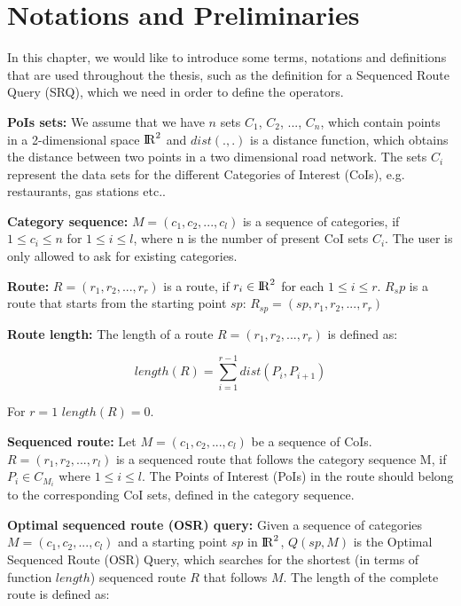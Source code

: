 \chapter{Notations and Preliminaries} 
\label{sec:notes}
In this chapter, we would like to introduce some terms, notations and definitions that are used throughout the thesis, such as the definition for a Sequenced Route Query (SRQ), which we need in order to define the operators.

\textbf{PoIs sets:} We assume that we have $n$ sets $C_1$, $C_2$, ..., $C_n$, which contain points in a 2-dimensional space ${\rm I\!R}^2$ and $dist(., .)$ is a distance function, which obtains the distance between two points in a two dimensional road network. The sets $C_i$ represent the data sets for the different Categories of Interest (CoIs), e.g. restaurants, gas stations etc.. 

\textbf{Category sequence:} $M = (c_1, c_2, ..., c_l)$ is a sequence of categories, if $1 \leq c_i \leq n$ for $1 \leq i \leq l$, where n is the number of present CoI sets $C_i$. The user is only allowed to ask for existing categories.

\textbf{Route:} $R =(r_1, r_2, ..., r_r)$ is a route, if $r_i \in {\rm I\!R}^2$ for each $1 \leq i \leq r$. $R_sp$ is a route that starts from the starting point $sp$: $R_{sp} = (sp, r_1, r_2, ..., r_r)$

\textbf{Route length:} The length of a route $R = (r_1, r_2, ..., r_r)$ is defined as:

\begin{equation}
length(R) = \sum_{i=1}^{r-1} dist(P_i, P_{i+1})
\end{equation}

For $r = 1$ $length(R) = 0$.

\textbf{Sequenced route:} Let $M = (c_1, c_2, ..., c_l)$ be a sequence of CoIs. $R = (r_1, r_2, ..., r_l)$ is a sequenced route that follows the category sequence M, if $P_i \in C_{M_i}$ where $1 \leq i \leq l$. The Points of Interest (PoIs) in the route should belong to the corresponding CoI sets, defined in the category sequence.

\textbf{Optimal sequenced route (OSR) query:} Given a sequence of categories $M = (c_1, c_2, ..., c_l)$ and a starting point $sp$ in ${\rm I\!R}^2$, $Q(sp, M)$ is the Optimal Sequenced Route (OSR) Query, which searches for the shortest (in terms of function $length$) sequenced route $R$ that follows $M$. The length of the complete route is defined as:

